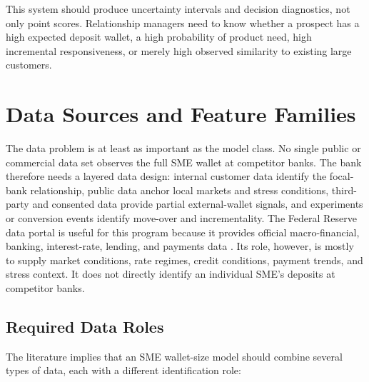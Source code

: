 \documentclass[11pt]{article}
\begin{document}
This system should produce uncertainty intervals and decision diagnostics, not
only point scores. Relationship managers need to know whether a prospect has a
high expected deposit wallet, a high probability of product need, high
incremental responsiveness, or merely high observed similarity to existing
large customers.

\section{Data Sources and Feature Families}

The data problem is at least as important as the model class. No single public
or commercial data set observes the full SME wallet at competitor banks. The
bank therefore needs a layered data design: internal customer data identify the
focal-bank relationship, public data anchor local markets and stress
conditions, third-party and consented data provide partial external-wallet
signals, and experiments or conversion events identify move-over and
incrementality. The Federal Reserve data portal is useful for this program
because it provides official macro-financial, banking, interest-rate, lending,
and payments data \citep{fed2026data}. Its role, however, is mostly to supply
market conditions, rate regimes, credit conditions, payment trends, and stress
context. It does not directly identify an individual SME's deposits at
competitor banks.

\subsection{Required Data Roles}

The literature implies that an SME wallet-size model should combine several
types of data, each with a different identification role:
\end{document}
